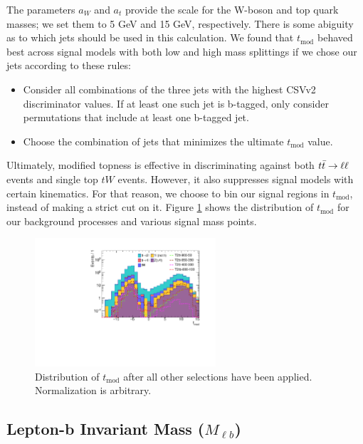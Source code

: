 The parameters $a_W$ and $a_t$ provide the scale for the W-boson
and top quark masses; we set them to 5 GeV and 15 GeV, respectively.
There is some abiguity as to which jets should be used in this
calculation. We found that $t_\text{mod}$ behaved best across signal
models with both low and high mass splittings if we chose our jets
according to these rules:
\begin{itemize}
\item Consider all combinations of the three jets with the highest
  CSVv2 discriminator values. If at least one such jet is b-tagged,
  only consider permutations that include at least one b-tagged jet.
\item Choose the combination of jets that minimizes the ultimate
  $t_\text{mod}$ value.
\end{itemize}
Ultimately, modified topness is effective in discriminating against
both $t\bar{t} \rightarrow \ell\ell$ events and single top $tW$ events. However, it also
suppresses signal models with certain kinematics. For that reason, we
choose to bin our signal regions in $t_\text{mod}$, instead of making
a strict cut on it. Figure \ref{fig:stop:tmod} shows the distribution
of $t_\text{mod}$ for our background processes and various signal mass
points.

\begin{figure}
\centering
\includegraphics[width=0.6\textwidth]{figures/nminusone_tmod.pdf}
\caption{Distribution of $t_\text{mod}$ after all other selections
  have been applied. Normalization is arbitrary.}
\label{fig:stop:tmod}
\end{figure}

\subsection{Lepton-b Invariant Mass (\texorpdfstring{$M_{\ell b}$}{mlb})}
\label{ssec:stop:mlb}


